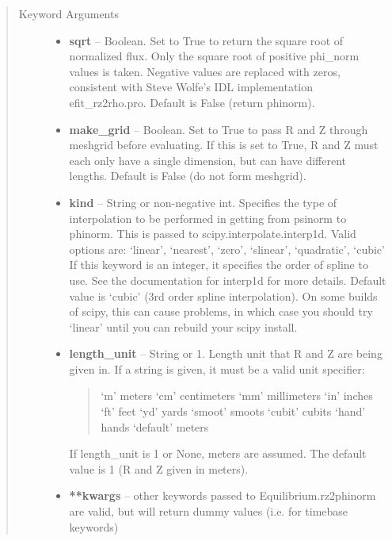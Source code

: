 \documentclass[letterpaper,10pt,english]{sphinxmanual}
\begin{document}
\begin{fulllineitems}
\begin{fulllineitems}
\begin{quote}
\begin{description}
\begin{itemize}
\end{itemize}

\item[{Keyword Arguments}] \leavevmode\begin{itemize}
\item {} 
\textbf{sqrt} --
Boolean. Set to True to return the square root of normalized
flux. Only the square root of positive phi\_norm values is taken.
Negative values are replaced with zeros, consistent with Steve
Wolfe's IDL implementation efit\_rz2rho.pro. Default is False
(return phinorm).

\item {} 
\textbf{make\_grid} --
Boolean. Set to True to pass R and Z through meshgrid
before evaluating. If this is set to True, R and Z must each
only have a single dimension, but can have different lengths.
Default is False (do not form meshgrid).

\item {} 
\textbf{kind} --
String or non-negative int. Specifies the type of interpolation
to be performed in getting from psinorm to phinorm. This is
passed to scipy.interpolate.interp1d. Valid options are:
`linear', `nearest', `zero', `slinear', `quadratic', `cubic'
If this keyword is an integer, it specifies the order of spline
to use. See the documentation for interp1d for more details.
Default value is `cubic' (3rd order spline interpolation). On
some builds of scipy, this can cause problems, in which case
you should try `linear' until you can rebuild your scipy install.

\item {} 
\textbf{length\_unit} --
String or 1. Length unit that R and Z are being given
in. If a string is given, it must be a valid unit specifier:
\begin{quote}

`m'         meters
`cm'        centimeters
`mm'        millimeters
`in'        inches
`ft'        feet
`yd'        yards
`smoot'     smoots
`cubit'     cubits
`hand'      hands
`default'   meters
\end{quote}

If length\_unit is 1 or None, meters are assumed. The default
value is 1 (R and Z given in meters).

\item {} 
\textbf{**kwargs} --
other keywords passed to Equilibrium.rz2phinorm are valid,
but will return dummy values (i.e. for timebase keywords)

\end{itemize}


\end{description}
\end{quote}
\end{fulllineitems}
\end{fulllineitems}
\end{document}
